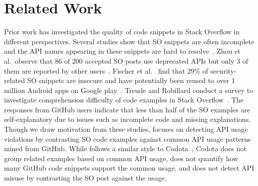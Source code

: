 \section{Related Work} 
Prior work has investigated the quality of code snippets in Stack Overflow in different perspectives. Several studies show that SO snippets are often incomplete and the API names appearing in these snippets are hard to resolve~\cite{dagenais2012recovering, subramanian2014live, yang2016query}. Zhou et al.~observe that 86 of 200 accepted SO posts use deprecated APIs but only 3 of them are reported by other users~\cite{zhou2016api}. Fischer et al.~ find that 29\% of security-related SO snippets are insecure and have potentially been reused to over 1 million Android apps on Google play~\cite{fischer2017stack}. Treude and Robillard conduct a survey to investigate comprehension difficulty of code examples in Stack Overflow~\cite{treude2017understanding}. The responses from GitHub users indicate that less than half of the SO examples are self-explanatory due to issues such as incomplete code and missing explanations. Though we draw motivation from these studies, {\tool} focuses on detecting API usage violations by contrasting SO code examples against common API usage patterns mined from GitHub. While {\tool} follows a similar style to Codota~\cite{codota}, Codota does not group related examples based on common API usage, does not quantify how many GitHub code snippets support the common usage, and does not detect API misuse by contrasting the SO post against the usage.


